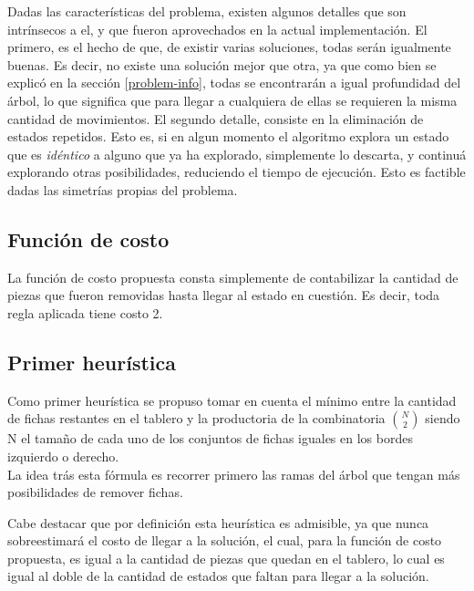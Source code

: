 \documentclass[a4paper,10pt]{article}
\begin{document}
    \label{implementation-details}
    Dadas las características del problema, existen algunos detalles que son intrínsecos a el, y que fueron aprovechados en la actual implementación. El primero, es el hecho
    de que, de existir varias soluciones, todas serán igualmente buenas. Es decir, no existe una solución mejor que otra, ya que como bien se explicó en la sección \ref{problem-info}, 
    todas se encontrarán a igual profundidad del árbol, lo que significa que para llegar a cualquiera de ellas se requieren la misma cantidad de movimientos. El segundo detalle, 
    consiste en la eliminación de estados repetidos. Esto es, si en algun momento el algoritmo explora un estado que es \textit{idéntico} a alguno que ya ha explorado, simplemente
    lo descarta, y continuá explorando otras posibilidades, reduciendo el tiempo de ejecución. Esto es factible dadas las simetrías propias del problema.\\

    \subsection{Función de costo}

    La función de costo propuesta consta simplemente de contabilizar la cantidad de piezas que fueron removidas hasta llegar al estado en cuestión. Es decir, toda regla aplicada 
    tiene costo 2. \\

    \subsection{Primer heurística}
    
    Como primer heurística se propuso tomar en cuenta el mínimo entre la cantidad de fichas restantes en el tablero y la productoria de la combinatoria  
    ${N \choose 2}$ siendo N el tamaño de cada uno de los conjuntos de fichas iguales en los bordes izquierdo o derecho.\\

    La idea trás esta fórmula es recorrer primero las ramas del árbol que tengan más posibilidades de remover fichas.

    Cabe destacar que por definición esta heurística es admisible, ya que nunca sobreestimará el costo de llegar a la solución, el cual, para la función de costo propuesta, es 
    igual a la cantidad de piezas que quedan en el tablero, lo cual es igual al doble de la cantidad de estados que faltan para llegar a la solución.
\end{document}
